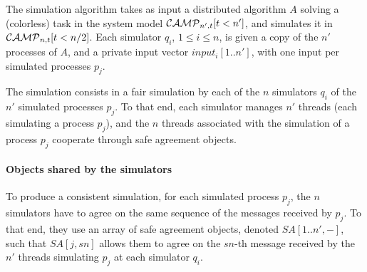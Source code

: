 \documentclass[11pt,letterpaper]{article}
\newcommand{\CM}{{\cal CAMP}_{n,t}}
\newcommand{\CMprim}{{\cal CAMP}_{n',t}}
\newcommand{\SA}{\mathit{SA}}
\begin{document}
The simulation algorithm takes as input a distributed algorithm $A$
solving a (colorless) task in the system model $\CMprim[t<n']$, and
simulates it in  $\CM[t<n/2]$.  Each simulator $q_i$, $1\leq i\leq n$,
is given a copy  of the $n'$ processes of $A$, and a private input vector
$input_i[1..n']$, with one input per simulated processes $p_j$.


The simulation consists in a fair simulation by each of the $n$
simulators $q_i$ of the $n'$ simulated processes $p_j$.
To that end,  each simulator manages $n'$ threads
(each simulating a process $p_j$), and the $n$ threads
associated with the simulation of a process $p_j$ cooperate
through safe agreement objects.


\paragraph{Objects shared by the simulators}
To produce a consistent simulation, for each simulated process $p_j$,
the $n$ simulators have to agree on the  same sequence of the messages
received by $p_j$. To that end, they use an array of safe agreement objects,
denoted $\SA[1..n',-]$, such that  $\SA[j,sn]$ allows them to agree on the
$sn$-th message received by the $n'$  threads simulating $p_j$ at each
simulator $q_i$.
\end{document}
